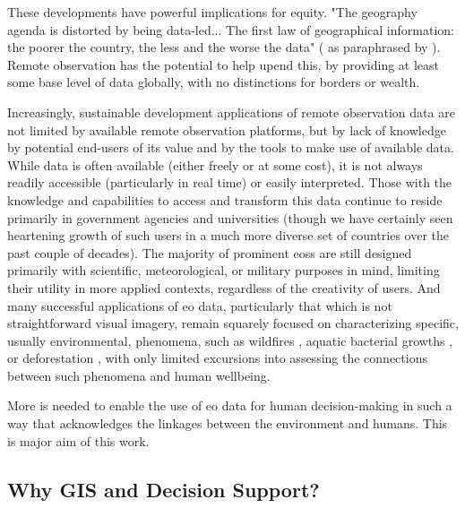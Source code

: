 These developments have powerful implications for equity. "The geography agenda is distorted by being data-led... The first law of geographical information: the poorer the country, the less and the worse the data"  (\cite{overton1991further} as paraphrased by \cite{taylorGeographicInformationSystems1994}). Remote observation has the potential to help upend this, by providing at least some base level of data globally, with no distinctions for borders or wealth.

Increasingly, sustainable development applications of remote observation data are not limited by available remote observation platforms, but by lack of knowledge by potential end-users of its value and by the tools to make use of available data. While data is often available (either freely or at some cost), it is not always readily accessible (particularly in real time) or easily interpreted. Those with the knowledge and capabilities to access and transform this data continue to reside primarily in government agencies and universities (though we have certainly seen heartening growth of such users in a much more diverse set of countries over the past couple of decades). The majority of prominent \acp{eos} are still designed primarily with scientific, meteorological, or military purposes in mind, limiting their utility in more applied contexts, regardless of the creativity of users. And many successful applications of \ac{eo} data, particularly that which is not straightforward visual imagery, remain squarely focused on characterizing specific, usually environmental, phenomena, such as wildfires \cite{schroederNewVIIRS375m2014},  aquatic bacterial growths \cite{stromingQuantifyingHumanHealth2020}, or deforestation \cite{lagomasinoMeasuringMangroveCarbon2019}, with only limited excursions into assessing the connections between such phenomena and human wellbeing.

More is needed to enable the use of \ac{eo} data for human decision-making in such a way that acknowledges the linkages between the environment and humans. This is major aim of this work. 


\subsection{Why GIS and Decision Support?} \label{sec:gis}

